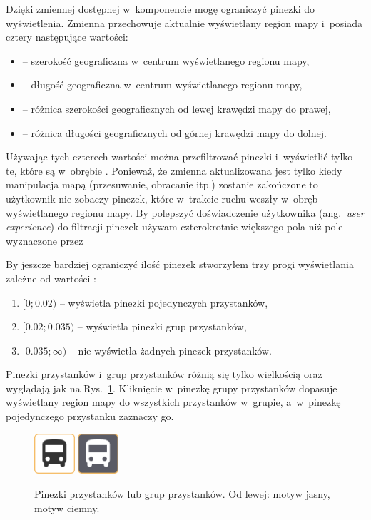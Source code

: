 \documentclass{SGGW-thesis}
\begin{document}
Dzięki zmiennej  dostępnej w~komponencie  mogę ograniczyć pinezki do wyświetlenia.
Zmienna  przechowuje aktualnie wyświetlany region mapy i~posiada cztery następujące wartości:
\begin{itemize}
  \item{ -- szerokość geograficzna w~centrum wyświetlanego regionu mapy,}
  \item{ -- długość geograficzna w~centrum wyświetlanego regionu mapy,}
  \item{ -- różnica szerokości geograficznych od lewej krawędzi mapy do prawej,}
  \item{ -- różnica długości geograficznych od górnej krawędzi mapy do dolnej.}
\end{itemize}
Używając tych czterech wartości można przefiltrować pinezki i~wyświetlić tylko te, które są w~obrębie .
Ponieważ, że zmienna  aktualizowana jest tylko kiedy manipulacja mapą (przesuwanie, obracanie itp.) zostanie zakończone to użytkownik nie zobaczy pinezek,
które w~trakcie ruchu weszły w~obręb wyświetlanego regionu mapy.
By polepszyć doświadczenie użytkownika (ang.~\textit{user experience}) do filtracji pinezek używam czterokrotnie większego pola niż pole wyznaczone przez 

By jeszcze bardziej ograniczyć ilość pinezek stworzyłem trzy progi wyświetlania zależne od wartości :
\begin{enumerate}
  \item{$[0;0.02)$ -- wyświetla pinezki pojedynczych przystanków,}
  \item{$[0.02; 0.035)$ -- wyświetla pinezki grup przystanków,}
  \item{$[0.035;\infty)$ -- nie wyświetla żadnych pinezek przystanków.}
\end{enumerate}


Pinezki przystanków i~grup przystanków różnią się tylko wielkością oraz wyglądają jak na Rys.~\ref{screen.pin_przystanki}.
Kliknięcie w~pinezkę grupy przystanków dopasuje wyświetlany region mapy do wszystkich przystanków w~grupie,
a~w~pinezkę pojedynczego przystanku zaznaczy go.
\begin{figure}
  \centering
  \includegraphics[width=15mm]{screeny/busstop_jasny}
  \enspace\enspace
  \includegraphics[width=15mm]{screeny/busstop_ciemny}
  \caption[Pinezki przystanków]{
    \label{screen.pin_przystanki}
    Pinezki przystanków lub grup przystanków. Od lewej: motyw jasny, motyw ciemny. \vspace{2ex}
  }
\end{figure}
\end{document}
